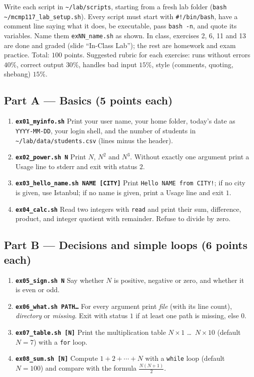 \documentclass[11pt,a4paper]{article}
\newcommand{\cmd}[1]{\texttt{#1}}
\begin{document}
Write each script in \texttt{\textasciitilde/lab/scripts}, starting from a fresh lab folder (\cmd{bash \textasciitilde/mcmp117\_lab\_setup.sh}). Every script must start with \texttt{\#!/bin/bash}, have a comment line saying what it does, be executable, pass \cmd{bash -n}, and quote its variables. Name them \texttt{exNN\_name.sh} as shown. In class, exercises 2, 6, 11 and 13 are done and graded (slide “In-Class Lab”); the rest are homework and exam practice. Total: $100$ points. Suggested rubric for each exercise: runs without errors $40\%$, correct output $30\%$, handles bad input $15\%$, style (comments, quoting, shebang) $15\%$.

\subsection*{Part A --- Basics (5 points each)}
\begin{enumerate}[leftmargin=1.6em]
  \item \textbf{\texttt{ex01\_myinfo.sh}} Print your user name, your home folder, today's date as \texttt{YYYY-MM-DD}, your login shell, and the number of students in \texttt{\textasciitilde/lab/data/students.csv} (lines minus the header).
  \item \textbf{\texttt{ex02\_power.sh N}} Print $N$, $N^2$ and $N^3$. Without exactly one argument print a Usage line to stderr and exit with status $2$.
  \item \textbf{\texttt{ex03\_hello\_name.sh NAME [CITY]}} Print \texttt{Hello NAME from CITY!}; if no city is given, use Istanbul; if no name is given, print a Usage line and exit $1$.
  \item \textbf{\texttt{ex04\_calc.sh}} Read two integers with \texttt{read} and print their sum, difference, product, and integer quotient with remainder. Refuse to divide by zero.
\end{enumerate}

\subsection*{Part B --- Decisions and simple loops (6 points each)}
\begin{enumerate}[leftmargin=1.6em,resume]
  \item \textbf{\texttt{ex05\_sign.sh N}} Say whether $N$ is positive, negative or zero, and whether it is even or odd.
  \item \textbf{\texttt{ex06\_what.sh PATH\ldots}} For every argument print \emph{file} (with its line count), \emph{directory} or \emph{missing}. Exit with status $1$ if at least one path is missing, else $0$.
  \item \textbf{\texttt{ex07\_table.sh [N]}} Print the multiplication table $N \times 1$ \ldots\ $N \times 10$ (default $N = 7$) with a \texttt{for} loop.
  \item \textbf{\texttt{ex08\_sum.sh [N]}} Compute $1 + 2 + \cdots + N$ with a \texttt{while} loop (default $N = 100$) and compare with the formula $\frac{N(N+1)}{2}$.
\end{enumerate}
\end{document}
